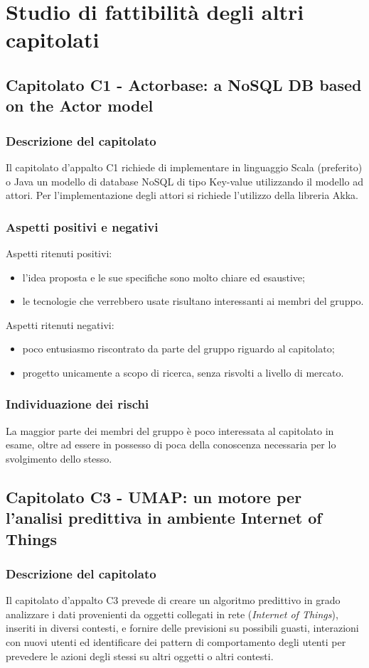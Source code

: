 \documentclass[../nStudioDiFattibilita.tex]{subfiles}
\begin{document}
\section{Studio di fattibilità degli altri capitolati}
	\subsection{Capitolato C1 - Actorbase: a NoSQL DB based on the Actor model}
		\subsubsection{Descrizione del capitolato}
		Il capitolato d'appalto C1 richiede di implementare in linguaggio Scala (preferito) o Java un modello di database NoSQL di tipo Key-value utilizzando il modello ad attori. Per l'implementazione degli attori si richiede l'utilizzo della libreria Akka.
		\subsubsection{Aspetti positivi e negativi}
		Aspetti ritenuti positivi:
			\begin{itemize}
				\item l'idea proposta e le sue specifiche sono molto chiare ed esaustive;
				\item le tecnologie che verrebbero usate risultano interessanti ai membri del gruppo.
			\end{itemize}
		Aspetti ritenuti negativi:
			\begin{itemize}
				\item poco entusiasmo riscontrato da parte del gruppo riguardo al capitolato;
				\item progetto unicamente a scopo di ricerca, senza risvolti a livello di mercato.
			\end{itemize}
		\subsubsection{Individuazione dei rischi}
		La maggior parte dei membri del gruppo è poco interessata al capitolato in esame, oltre ad essere in possesso di poca della conoscenza necessaria per lo svolgimento dello stesso.		
	\subsection{Capitolato C3 - UMAP: un motore per l'analisi predittiva in ambiente Internet of Things}
		\subsubsection{Descrizione del capitolato}
		Il capitolato d'appalto C3 prevede di creare un algoritmo predittivo in grado analizzare i dati provenienti da oggetti collegati in rete (\textit{Internet of Things}), inseriti in diversi contesti, e fornire delle previsioni su possibili guasti, interazioni con nuovi utenti ed identificare dei pattern di comportamento degli utenti per prevedere le azioni degli stessi su altri oggetti o altri contesti.
\end{document}
